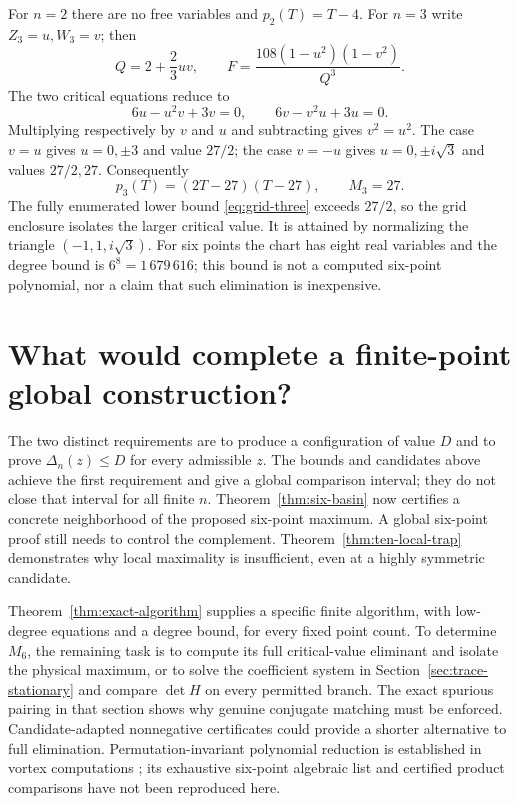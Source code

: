 \documentclass[11pt]{article}
\theoremstyle{remark}
\numberwithin{equation}{section}
\begin{document}
For $n=2$ there are no free variables and $p_2(T)=T-4$.
For $n=3$ write $Z_3=u,W_3=v$; then
\[
 Q=2+\frac23uv,\qquad
 F=\frac{108(1-u^2)(1-v^2)}{Q^3}.
\]
The two critical equations reduce to
\[
 6u-u^2v+3v=0,\qquad6v-v^2u+3u=0.
\]
Multiplying respectively by $v$ and $u$ and subtracting gives
$v^2=u^2$. The case $v=u$ gives $u=0,\pm3$ and value $27/2$;
the case $v=-u$ gives $u=0,\pm i\sqrt3$ and values $27/2,27$.
Consequently
\[
 p_3(T)=(2T-27)(T-27),\qquad M_3=27.
\]
The fully enumerated lower bound \eqref{eq:grid-three} exceeds $27/2$,
so the grid enclosure isolates the larger critical value.
It is attained by normalizing the triangle $(-1,1,i\sqrt3)$.
For six points the chart has eight real variables and the degree
bound is $6^8=1\,679\,616$; this bound is not a computed six-point
polynomial, nor a claim that such elimination is inexpensive.

\section{What would complete a finite-point global construction?}
The two distinct requirements are to produce a configuration of
value $D$ and to prove $\Delta_n(z)\le D$ for every admissible $z$.
The bounds and candidates above achieve the first requirement and
give a global comparison interval; they do not close that interval
for all finite $n$.
Theorem~\ref{thm:six-basin} now certifies a concrete neighborhood of
the proposed six-point maximum. A global six-point proof still needs
to control the complement. Theorem~\ref{thm:ten-local-trap} demonstrates
why local maximality is insufficient, even at a highly symmetric
candidate.

Theorem~\ref{thm:exact-algorithm} supplies a specific finite algorithm,
with low-degree equations and a degree bound, for every fixed point
count. To determine $M_6$, the remaining task is to compute its full
critical-value eliminant and isolate the physical maximum, or to
solve the coefficient system in Section~\ref{sec:trace-stationary}
and compare $\det H$ on every permitted branch.
The exact spurious pairing in that section shows why genuine
conjugate matching must be enforced. Candidate-adapted nonnegative
certificates could provide a shorter alternative to full elimination.
Permutation-invariant polynomial reduction is established in vortex
computations \cite{FS}; its exhaustive six-point algebraic list and
certified product comparisons have not been reproduced here.
\end{document}
